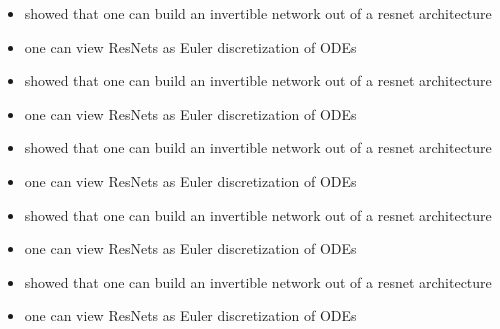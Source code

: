 \begin{itemize}
\item \cite{behrmann2019invertible} showed that one can build an invertible network out of a resnet architecture \parencite{He:2015wrn} 
\item one can view ResNets as Euler discretization of ODEs 
\end{itemize}
\begin{itemize}
\item \cite{behrmann2019invertible} showed that one can build an invertible network out of a resnet architecture \parencite{He:2015wrn} 
\item one can view ResNets as Euler discretization of ODEs 
\end{itemize}
\begin{itemize}
\item \cite{behrmann2019invertible} showed that one can build an invertible network out of a resnet architecture \parencite{He:2015wrn} 
\item one can view ResNets as Euler discretization of ODEs 
\end{itemize}
\begin{frame}[t]
\begin{itemize}
\item \cite{behrmann2019invertible} showed that one can build an invertible network out of a resnet architecture \parencite{He:2015wrn} 
\item one can view ResNets as Euler discretization of ODEs 
\end{itemize}
\end{frame}

\begin{frame}[t]
\begin{itemize}
\item \cite{behrmann2019invertible} showed that one can build an invertible network out of a resnet architecture \parencite{He:2015wrn} 
\item one can view ResNets as Euler discretization of ODEs 
\end{itemize}
\end{frame}

